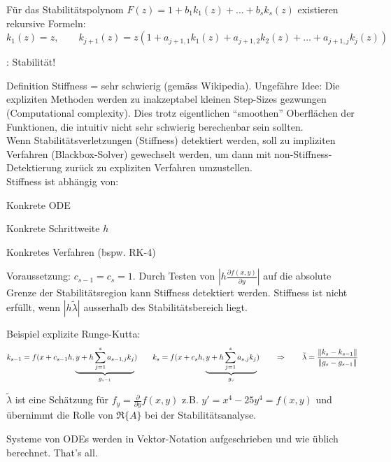       \vspace{1em}
       
        Für das Stabilitätspolynom $F(z) = 1 + b_1 k_1(z) + \ldots + b_sk_s(z)$ existieren 
        rekursive Formeln:\\
        $k_1(z) = z, \qquad k_{j+1}(z) = z(1 + a_{j+1,1} k_1(z) + a_{j+1,2} k_2(z) + \ldots + a_{j+1,j} k_j(z))$
      
      \vspace{1em}
      : Stabilität!
    
      Definition Stiffness = sehr schwierig (gemäss Wikipedia). Ungefähre Idee: Die expliziten 
      Methoden werden zu inakzeptabel kleinen Step-Sizes gezwungen (Computational complexity). 
      Dies trotz eigentlichen "`smoothen"' Oberflächen der Funktionen, die intuitiv nicht sehr 
      schwierig berechenbar sein sollten. \\
      
      Wenn Stabilitätsverletzungen (Stiffness) detektiert werden, soll zu 
      impliziten Verfahren (Blackbox-Solver) gewechselt werden, um dann mit non-Stiffness-Detektierung 
      zurück zu expliziten Verfahren umzustellen.\\
      
      Stiffness ist abhängig von:
      \begin{liste}
        \item Konkrete ODE
        \item Konkrete Schrittweite $h$
        \item Konkretes Verfahren (bspw. RK-4)
      \end{liste}
      
        Voraussetzung: $c_{s-1} = c_s = 1$. Durch Testen von $\left|h \frac{\partial f(x,y)}{\partial y} \right|$ 
        auf die absolute Grenze der Stabilitätsregion kann
        Stiffness detektiert werden. Stiffness ist nicht erfüllt, wenn $|h \tilde{\lambda}|$ 
        ausserhalb des Stabilitätsbereich liegt.
        
        Beispiel explizite Runge-Kutta: 
        $$k_{s-1} = f(x+c_{s-1} h, \underbrace{y + h \sum\limits_{j=1}^s a_{s-1,j}k_j}_{g_{s-1}}) \qquad       
        k_{s} = f(x+c_{s} h, \underbrace{y + h \sum\limits_{j=1}^s a_{s,j}k_j}_{g_{s}}) \qquad 
        \Rightarrow \qquad \tilde{\lambda} = \frac{\Arrowvert k_s - k_{s-1} \Arrowvert}{\Arrowvert g_s - g_{s-1} \Arrowvert}$$
        
        $\tilde{\lambda}$ ist eine Schätzung für $f_y = \frac{\partial}{\partial y}f(x,y)$ z.B. $y'=x^4-25y^4=f(x,y)$ 
         und übernimmt die Rolle von $\Re \{A\}$ bei der Stabilitätsanalyse. 
        
        
    Systeme von ODEs werden in Vektor-Notation aufgeschrieben und wie üblich berechnet. 
    That's all.
    
  